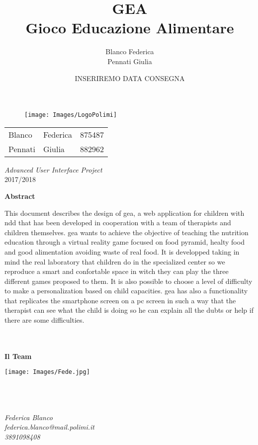 \documentclass[a4paper, 12pt]{article}
\title{\textbf{GEA}\\[3mm]
Gioco Educazione Alimentare}
\author{Blanco Federica\\Pennati Giulia%
}
\date{INSERIREMO DATA CONSEGNA} %
\makeatletter
\renewcommand{\maketitle}{ 
\begin{figure}[h]
\centering
\texttt{[image: Images/LogoPolimi]}\\[.5cm]
\end{figure}

\vspace{50pt}

\begin{flushright} %
\@date 

{\huge\@title} %
\vspace{140pt} %


\begin{tabular}{ l l c}
\large Blanco &  \large Federica & \large 875487\\
\large Pennati & \large Giulia & \large 882962\\
\end{tabular}

\vspace{40pt} %
\end{flushright}
\centering
\textsl{\large Advanced User Interface Project}\\
2017/2018
}
\makeatother
\begin{document}
\begin{titlepage}

\thispagestyle{empty}
\maketitle %

\end{titlepage}

\clearpage
\begin{center}
\textbf{Abstract}\\
\end{center}
This document describes the design of \acs{gea}, a web application for children with \acl{ndd} that has been developed in cooperation with a team of therapists and children themselves. \acs{gea} wants to achieve the objective of teaching the nutrition education through a virtual reality game focused on food pyramid, healty food and good alimentation avoiding waste of real food. It is developped taking in mind the real laboratory that children do in the specialized center so we reproduce a smart and confortable space in witch they can play the three different games proposed to them. It is also possible to choose a level of difficulty to make a personalization based on child capacities. \acs{gea} has also a functionality that replicates the smartphone screen on a pc screen in such a way that the therapist can see what the child is doing so he can explain all the dubts or help if there are some difficulties. %
\\
\\
\\
\begin{center}
\textbf{Il Team}\\
\end{center}
\vspace{40px}
\begin{minipage}{.30\textwidth}
\centering
\texttt{[image: Images/Fede.jpg]}
\end{minipage}
\\
\\
\\
\emph{Federica Blanco\\ federica.blanco@mail.polimi.it\\ 3891098408}
\clearpage


%
\thispagestyle{empty}
\tableofcontents
\clearpage 
\thispagestyle{empty}
\listoffigures
\clearpage 
\end{document}
